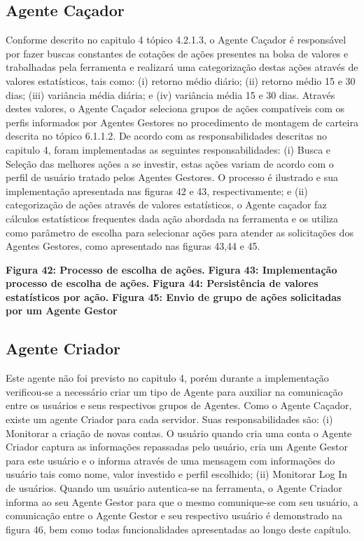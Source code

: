 \subsection{Agente Caçador}

Conforme descrito no capitulo 4 tópico 4.2.1.3, o Agente Caçador é responsável por fazer buscas constantes de cotações de ações presentes na bolsa de valores e trabalhadas pela ferramenta e realizará uma categorização destas ações através de valores estatísticos, tais como: (i) retorno médio diário; (ii) retorno médio 15 e 30 dias; (iii) variância média diária; e (iv) variância média 15 e 30 dias. Através destes valores, o Agente Caçador seleciona grupos de ações compatíveis com os perfis informados por Agentes Gestores no procedimento de montagem de carteira descrita no tópico 6.1.1.2. De acordo com as responsabilidades descritas no capitulo 4, foram implementadas as seguintes responsabilidades: (i) Busca e Seleção das melhores ações a se investir, estas ações variam de acordo com o perfil de usuário tratado pelos Agentes Gestores. O processo é ilustrado e sua implementação apresentada nas figuras 42 e 43, respectivamente; e (ii) categorização de ações através de valores estatísticos, o Agente caçador faz cálculos estatísticos frequentes dada ação abordada na ferramenta e os utiliza como parâmetro de escolha para selecionar ações para atender as solicitações dos Agentes Gestores, como apresentado nas figuras 43,44 e 45.

\textbf{Figura 42: Processo de escolha de ações.}
\textbf{Figura 43: Implementação processo de escolha de ações.}
\textbf{Figura 44: Persistência de valores estatísticos por ação.}
\textbf{Figura 45: Envio de grupo de ações solicitadas por um Agente Gestor}

\subsection{Agente Criador}

Este agente não foi previsto no capitulo 4, porém durante a implementação verificou-se a necessário criar um tipo de Agente para auxiliar na comunicação entre os usuários e seus respectivos grupos de Agentes. Como o Agente Caçador, existe um agente Criador para cada servidor. Suas responsabilidades são: (i) Monitorar a criação de novas contas. O usuário quando cria uma conta o Agente Criador captura as informações repassadas pelo usuário, cria um Agente Gestor para este usuário e o informa através de uma mensagem com informações do usuário tais como nome, valor investido e perfil escolhido; (ii) Monitorar Log In de usuários.  Quando um usuário autentica-se na ferramenta, o Agente Criador informa ao seu Agente Gestor para que o mesmo comunique-se com seu usuário, a comunicação entre o Agente Gestor e seu respectivo usuário é demonstrado na figura 46, bem como todas funcionalidades apresentadas ao longo deste capítulo.

